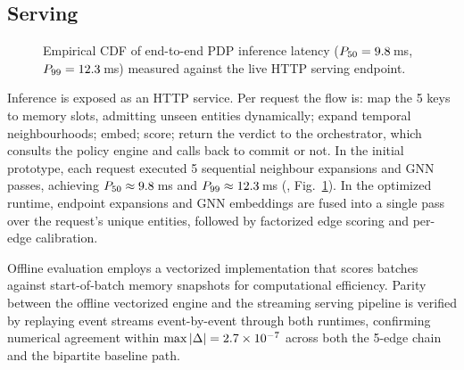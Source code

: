 \subsection{Serving}

\begin{figure}[ht!]
\centering
{}
\caption{Empirical CDF of end-to-end PDP inference latency ($P_{50} = 9.8$\,ms, $P_{99} = 12.3$\,ms) measured against the live HTTP serving endpoint.}
\label{fig:latency_cdf}
\end{figure}

Inference is exposed as an HTTP service. Per request the flow is: map the 5 keys to
memory slots, admitting unseen entities dynamically; expand temporal neighbourhoods;
embed; score; return the verdict to the orchestrator, which consults the policy engine
and calls back to commit or not. In the initial prototype, each request executed 5 sequential
neighbour expansions and GNN passes, achieving $P_{50} \approx 9.8$\,ms and
$P_{99} \approx 12.3$\,ms (\prelimnote, Fig.~\ref{fig:latency_cdf}). In the
optimized runtime, endpoint expansions and GNN embeddings are fused into a single pass over
the request's unique entities, followed by factorized edge scoring and per-edge calibration.

Offline evaluation employs a vectorized implementation that scores batches against
start-of-batch memory snapshots for computational efficiency. Parity between the offline
vectorized engine and the streaming serving pipeline is verified by replaying event streams
event-by-event through both runtimes, confirming numerical agreement within
$\max|\Delta| = 2.7\times10^{-7}$ across both the 5-edge chain and the bipartite baseline path.

